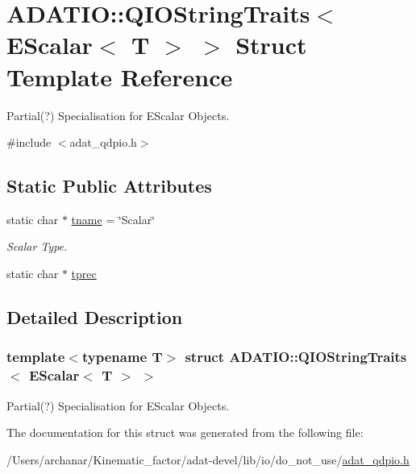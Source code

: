 \hypertarget{structADATIO_1_1QIOStringTraits_3_01EScalar_3_01T_01_4_01_4}{}\section{A\+D\+A\+T\+IO\+:\+:Q\+I\+O\+String\+Traits$<$ E\+Scalar$<$ T $>$ $>$ Struct Template Reference}
\label{structADATIO_1_1QIOStringTraits_3_01EScalar_3_01T_01_4_01_4}


Partial(?) Specialisation for E\+Scalar Objects.  




{\ttfamily \#include $<$adat\+\_\+qdpio.\+h$>$}

\subsection*{Static Public Attributes}
\begin{DoxyCompactItemize}
\item 
static char $\ast$ \mbox{\hyperlink{group__qio_gaf5e0f914e1c7e78a69472bffe5e470b7}{tname}} = \char`\"{}Scalar\char`\"{}
\begin{DoxyCompactList}\small\item\em Scalar Type. \end{DoxyCompactList}\item 
static char $\ast$ \mbox{\hyperlink{group__qio_ga3fb5d4202ab2a67bf71bdcc4de33b02d}{tprec}}
\end{DoxyCompactItemize}


\subsection{Detailed Description}
\subsubsection*{template$<$typename T$>$\newline
struct A\+D\+A\+T\+I\+O\+::\+Q\+I\+O\+String\+Traits$<$ E\+Scalar$<$ T $>$ $>$}

Partial(?) Specialisation for E\+Scalar Objects. 

The documentation for this struct was generated from the following file\+:\begin{DoxyCompactItemize}
\item 
/\+Users/archanar/\+Kinematic\+\_\+factor/adat-\/devel/lib/io/do\+\_\+not\+\_\+use/\mbox{\hyperlink{adat-devel_2lib_2io_2do__not__use_2adat__qdpio_8h}{adat\+\_\+qdpio.\+h}}\end{DoxyCompactItemize}
